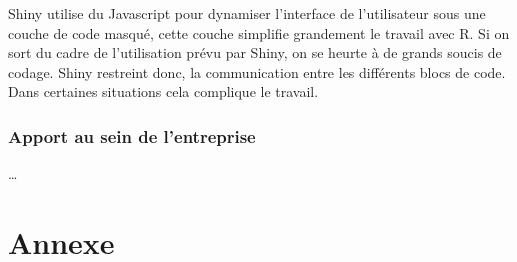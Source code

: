\documentclass[]{report}
\begin{document}
Shiny utilise du Javascript pour dynamiser l'interface de l'utilisateur
sous une couche de code masqué, cette couche simplifie grandement le
travail avec R. Si on sort du cadre de l'utilisation prévu par Shiny, on
se heurte à de grands soucis de codage. Shiny restreint donc, la
communication entre les différents blocs de code. Dans certaines
situations cela complique le travail.

\subsection{Apport au sein de
l'entreprise}\label{apport-au-sein-de-lentreprise}

\ldots{}

\chapter{Annexe}\label{annexe}
\end{document}
